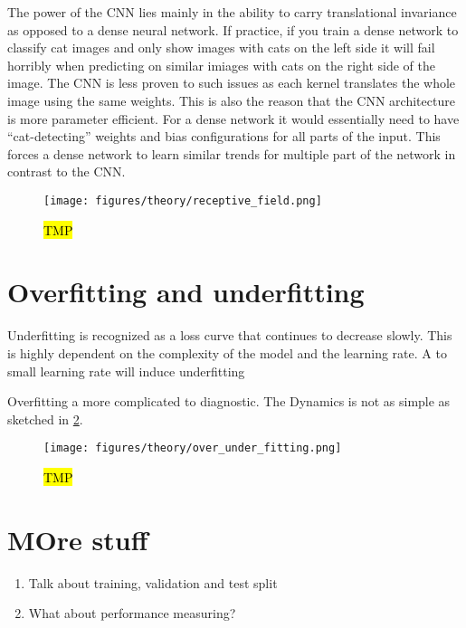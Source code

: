 The power of the \acrshort{CNN} lies mainly in the ability to carry
translational invariance as opposed to a dense neural network. If practice, if
you train a dense network to classify cat images and only show images with cats
on the left side it will fail horribly when predicting on similar imiages with
cats on the right side of the image. The \acrshort{CNN} is less proven to such
issues as each kernel translates the whole image using the same weights. This is
also the reason that the \acrshort{CNN} architecture is more parameter
efficient. For a dense network it would essentially need to have
``cat-detecting'' weights and bias configurations for all parts of the input.
This forces a dense network to learn similar trends for multiple part of the
network in contrast to the \acrshort{CNN}.



\begin{figure}[H]
  \centering
  \texttt{[image: figures/theory/receptive\_field.png]}
  \caption{\hl{TMP}}
  \label{fig:receptive_field}
\end{figure}


\section{Overfitting and underfitting}

Underfitting is recognized as a loss curve that continues to decrease slowly. This is highly dependent on the complexity of the model and the learning rate. A to small learning rate will induce underfitting

Overfitting a more complicated to diagnostic. The Dynamics is not as simple as sketched in \cref{fig:over_under_fitting}.


\begin{figure}[H]
  \centering
  \texttt{[image: figures/theory/over\_under\_fitting.png]}
  \caption{\hl{TMP} \cite{smith2018disciplined}}
  \label{fig:over_under_fitting}
\end{figure}

\section{MOre stuff}
\begin{enumerate}
  \item Talk about training, validation and test split
  \item What about performance measuring?
\end{enumerate}



